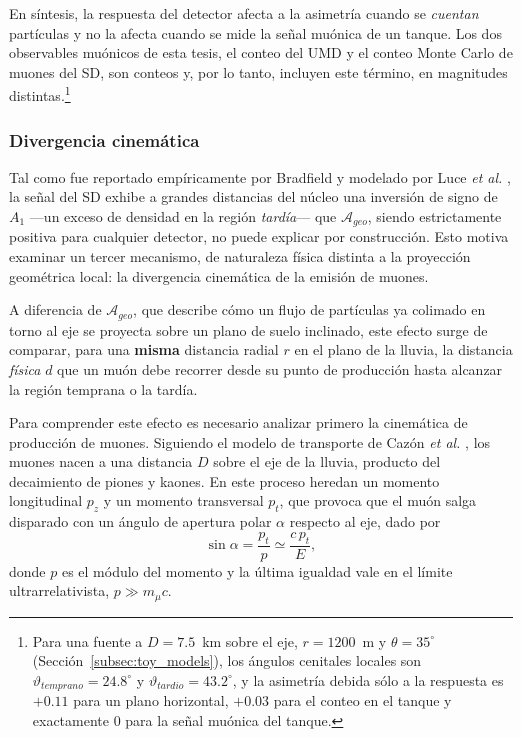 En síntesis, la respuesta del detector afecta a la asimetría cuando se \textit{cuentan} partículas y no la afecta cuando se mide la señal muónica de un tanque. Los dos observables muónicos de esta tesis, el conteo del UMD y el conteo Monte Carlo de muones del SD, son conteos y, por lo tanto, incluyen este término, en magnitudes distintas.\footnote{Para una fuente a $D=7.5$~km sobre el eje, $r=1200$~m y $\theta=35^\circ$ (Sección~\ref{subsec:toy_models}), los ángulos cenitales locales son $\vartheta_{temprano}=24.8^\circ$ y $\vartheta_{tardio}=43.2^\circ$, y la asimetría debida sólo a la respuesta es $+0.11$ para un plano horizontal, $+0.03$ para el conteo en el tanque y exactamente $0$ para la señal muónica del tanque.}

\subsubsection{Divergencia cinemática}
\label{subsubsec:divergencia_cinematica}

Tal como fue reportado empíricamente por Bradfield \cite{BradfieldThesis} y modelado por Luce \textit{et al.} \cite{Luce_ICRC2021}, la señal del SD exhibe a grandes distancias del núcleo una inversión de signo de $A_1$ ---un exceso de densidad en la región \textit{tardía}--- que $\mathcal{A}_{geo}$, siendo estrictamente positiva para cualquier detector, no puede explicar por construcción. Esto motiva examinar un tercer mecanismo, de naturaleza física distinta a la proyección geométrica local: la divergencia cinemática de la emisión de muones.

A diferencia de $\mathcal{A}_{geo}$, que describe cómo un flujo de partículas ya colimado en torno al eje se proyecta sobre un plano de suelo inclinado, este efecto surge de comparar, para una \textbf{misma} distancia radial $r$ en el plano de la lluvia, la distancia \textit{física} $d$ que un muón debe recorrer desde su punto de producción hasta alcanzar la región temprana o la tardía.

Para comprender este efecto es necesario analizar primero la cinemática de producción de muones. Siguiendo el modelo de transporte de Cazón \textit{et al.} \cite{Cazon2012}, los muones nacen a una distancia $D$ sobre el eje de la lluvia, producto del decaimiento de piones y kaones. En este proceso heredan un momento longitudinal $p_z$ y un momento transversal $p_t$, que provoca que el muón salga disparado con un ángulo de apertura polar $\alpha$ respecto al eje, dado por
\begin{equation}
	\sin\alpha = \frac{p_t}{p} \simeq \frac{c\,p_t}{E},
	\label{eq:cazon_alpha}
\end{equation}
donde $p$ es el módulo del momento y la última igualdad vale en el límite ultrarrelativista, $p \gg m_\mu c$.

